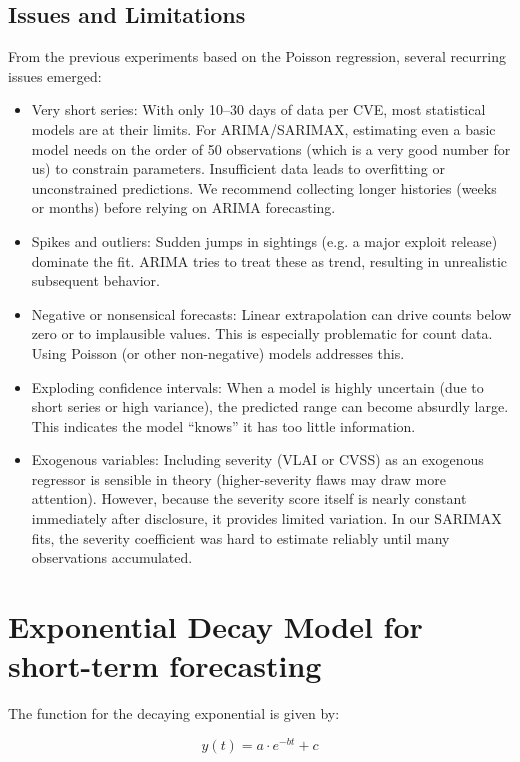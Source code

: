 \documentclass[]{article}
\begin{document}
\subsection{Issues and Limitations}

From the previous experiments based on the Poisson regression, several recurring issues emerged:

\begin{itemize}
 \item Very short series: With only 10–30 days of data per CVE, most statistical models are at their limits. For ARIMA/SARIMAX, estimating even a basic model needs on the order of 50 observations (which is a very good number for us) to constrain parameters. Insufficient data leads to overfitting or unconstrained predictions. We recommend collecting longer histories (weeks or months) before relying on ARIMA forecasting.
 \item Spikes and outliers: Sudden jumps in sightings (e.g. a major exploit release) dominate the fit. ARIMA tries to treat these as trend, resulting in unrealistic subsequent behavior.
 \item Negative or nonsensical forecasts: Linear extrapolation can drive counts below zero or to implausible values. This is especially problematic for count data. Using Poisson (or other non-negative) models addresses this.
 \item Exploding confidence intervals: When a model is highly uncertain (due to short series or high variance), the predicted range can become absurdly large. This indicates the model “knows” it has too little information.
 \item Exogenous variables: Including severity (VLAI or CVSS) as an exogenous regressor is sensible in theory (higher-severity flaws may draw more attention). However, because the severity score itself is nearly constant immediately after disclosure, it provides limited variation. In our SARIMAX fits, the severity coefficient was hard to estimate reliably until many observations accumulated.
\end{itemize}



\section{Exponential Decay Model for short-term forecasting}

The function for the decaying exponential is given by:

\begin{equation}
y(t) = a \cdot e^{-bt} + c
\end{equation}
\end{document}
